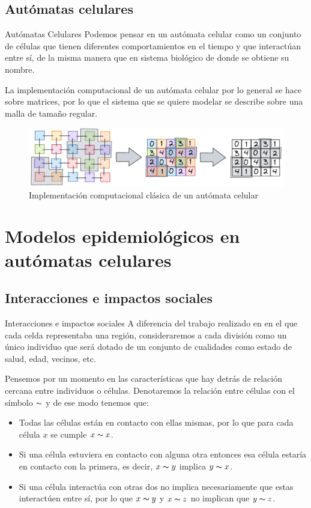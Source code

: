 \documentclass[9pt]{beamer}
\begin{document}
\subsection{Autómatas celulares}
\begin{frame}{Autómatas Celulares}
Podemos pensar en un autómata celular como un conjunto de células que tienen diferentes comportamientos en el tiempo y que interactúan entre sí, de la misma manera que en sistema biológico de donde se obtiene su nombre.

La implementación computacional de un autómata celular por lo general se hace sobre matrices, por lo que el sistema que se quiere modelar se describe sobre una malla de tamaño regular.

\begin{figure}[h]
  \centering
    \includegraphics[width=1\textwidth]{Imagenes/ACaMatriz.PNG}
  \caption{Implementación computacional clásica de un autómata celular}
  \label{fig:AC a matriz}
\end{figure}
\end{frame}

\section{Modelos epidemiológicos en autómatas celulares}
\subsection{Interacciones e impactos sociales}
\begin{frame}{Interacciones e impactos sociales}
A diferencia del trabajo realizado en \cite{populationDensity} en el que cada celda representaba una región, consideraremos a cada división como un único individuo que será dotado de un conjunto de cualidades como estado de salud, edad, vecinos, etc.

Pensemos por un momento en las características que hay detrás de relación cercana entre individuos o células. Denotaremos la relación entre células con el símbolo $\thicksim$ y de ese modo tenemos que:

\begin{itemize}
    \item Todas las células están en contacto con ellas mismas, por lo que para cada célula $x$ se cumple $x \thicksim x$.
    \item Si una célula estuviera en contacto con alguna otra entonces esa célula estaría en contacto con la primera, es decir, $x\thicksim y$ implica $y\thicksim x$.
    \item Si una célula interactúa con otras dos no implica necesariamente que estas interactúen entre sí, por lo que $x\thicksim y$ y $x\thicksim z$ no implican que $y\thicksim z$.
\end{itemize}
\end{frame}
\end{document}
